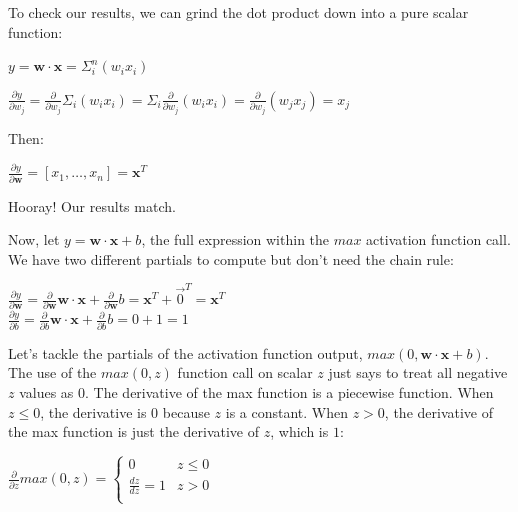 \documentclass[11pt]{article}
\begin{document}
To check our results, we can grind the dot product down into a pure scalar function:

$y = \mathbf{w} \cdot \mathbf{x} = \Sigma_i^n (w_i x_i)$

$\frac{\partial y}{\partial w_j} = \frac{\partial}{\partial w_j} \Sigma_i (w_i x_i) = \Sigma_i \frac{\partial}{\partial w_j} (w_i x_i) = \frac{\partial}{\partial w_j} (w_j x_j) = x_j$

Then:

$\frac{\partial y}{\partial \mathbf{w}} = [ x_1, \ldots, x_n ] = \mathbf{x}^T$

Hooray! Our results match. 

Now, let $y = \mathbf{w} \cdot \mathbf{x} + b$, the full expression within the $max$ activation function call. We have two different partials to compute but don't need the chain rule:

$\frac{\partial y}{\partial \mathbf{w}} = \frac{\partial }{\partial \mathbf{w}}\mathbf{w} \cdot \mathbf{x} + \frac{\partial }{\partial \mathbf{w}}b = \mathbf{x}^T + \vec{0}^T = \mathbf{x}^T$\\
$\frac{\partial y}{\partial b} = \frac{\partial }{\partial b}\mathbf{w} \cdot \mathbf{x} + \frac{\partial }{\partial b}b = 0 + 1 = 1$

Let's tackle the partials of the activation function output, $max(0, \mathbf{w} \cdot \mathbf{x} + b)$. The use of the $max(0,z)$ function call on scalar $z$ just says to treat all negative $z$ values as 0.  The derivative of the max function is a piecewise function. When $z \leq 0$, the derivative is 0 because $z$ is a constant. When $z > 0$, the derivative of the max function is just the derivative of $z$, which is $1$:

$
\frac{\partial}{\partial z}max(0,z) =
	\begin{cases}
	0 & z \leq 0\\
	\frac{dz}{dz}=1 & z > 0\\
\end{cases}
$
\end{document}
